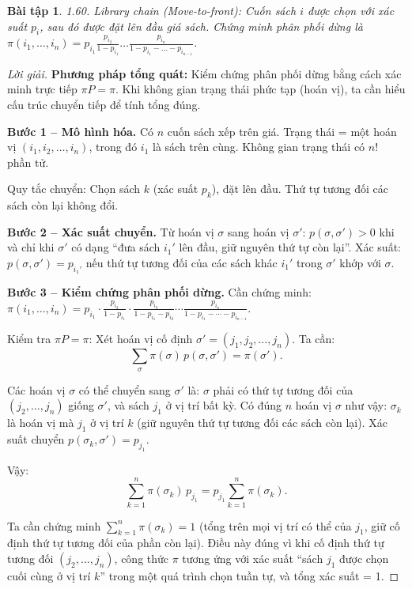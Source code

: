 \documentclass[8pt,a4paper]{article}
\newtheorem{exercise}{Bài tập}
\newenvironment{solution}{\begin{proof}[Lời giải]}{\end{proof}}
\begin{document}
\begin{exercise}
1.60. Library chain (Move-to-front): Cuốn sách $i$ được chọn với xác suất $p_i$, sau đó được đặt lên đầu giá sách. Chứng minh phân phối dừng là $\pi(i_1, \dots, i_n) = p_{i_1} \frac{p_{i_2}}{1-p_{i_1}} \dots \frac{p_{i_n}}{1-p_{i_1}-\dots-p_{i_{n-1}}}$.
\end{exercise}
\begin{solution}
\textbf{Phương pháp tổng quát:} Kiểm chứng phân phối dừng bằng cách xác minh trực tiếp $\pi P = \pi$. Khi không gian trạng thái phức tạp (hoán vị), ta cần hiểu cấu trúc chuyển tiếp để tính tổng đúng.

\textbf{Bước 1 -- Mô hình hóa.}
Có $n$ cuốn sách xếp trên giá. Trạng thái = một hoán vị $(i_1, i_2, \ldots, i_n)$, trong đó $i_1$ là sách trên cùng. Không gian trạng thái có $n!$ phần tử.

Quy tắc chuyển: Chọn sách $k$ (xác suất $p_k$), đặt lên đầu. Thứ tự tương đối các sách còn lại không đổi.

\textbf{Bước 2 -- Xác suất chuyển.}
Từ hoán vị $\sigma$ sang hoán vị $\sigma'$: $p(\sigma, \sigma') > 0$ khi và chỉ khi $\sigma'$ có dạng ``đưa sách $i_1'$ lên đầu, giữ nguyên thứ tự còn lại''. Xác suất: $p(\sigma, \sigma') = p_{i_1'}$ nếu thứ tự tương đối của các sách khác $i_1'$ trong $\sigma'$ khớp với $\sigma$.

\textbf{Bước 3 -- Kiểm chứng phân phối dừng.}
Cần chứng minh: $\pi(i_1, \ldots, i_n) = p_{i_1} \cdot \frac{p_{i_2}}{1 - p_{i_1}} \cdot \frac{p_{i_3}}{1 - p_{i_1} - p_{i_2}} \cdots \frac{p_{i_n}}{1 - p_{i_1} - \cdots - p_{i_{n-1}}}$.

Kiểm tra $\pi P = \pi$: Xét hoán vị cố định $\sigma' = (j_1, j_2, \ldots, j_n)$. Ta cần:
\[
  \sum_\sigma \pi(\sigma)\, p(\sigma, \sigma') = \pi(\sigma').
\]

Các hoán vị $\sigma$ có thể chuyển sang $\sigma'$ là: $\sigma$ phải có thứ tự tương đối của $(j_2, \ldots, j_n)$ giống $\sigma'$, và sách $j_1$ ở vị trí bất kỳ. Có đúng $n$ hoán vị $\sigma$ như vậy: $\sigma_k$ là hoán vị mà $j_1$ ở vị trí $k$ (giữ nguyên thứ tự tương đối các sách còn lại). Xác suất chuyển $p(\sigma_k, \sigma') = p_{j_1}$.

Vậy:
\[
  \sum_{k=1}^{n} \pi(\sigma_k)\, p_{j_1} = p_{j_1} \sum_{k=1}^{n} \pi(\sigma_k).
\]

Ta cần chứng minh $\sum_{k=1}^{n} \pi(\sigma_k) = 1$ (tổng trên mọi vị trí có thể của $j_1$, giữ cố định thứ tự tương đối của phần còn lại). Điều này đúng vì khi cố định thứ tự tương đối $(j_2, \ldots, j_n)$, công thức $\pi$ tương ứng với xác suất ``sách $j_1$ được chọn cuối cùng ở vị trí $k$'' trong một quá trình chọn tuần tự, và tổng xác suất = 1.


\end{solution}
\end{document}
